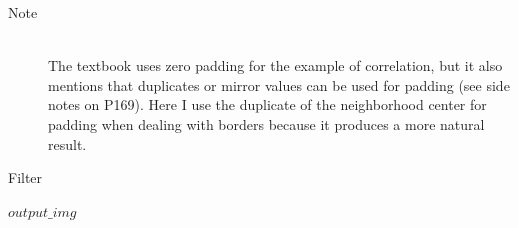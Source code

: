 \documentclass{article}
\begin{document}
\begin{description}
\item[Note] \hfill \\
The textbook uses zero padding for the example of correlation, but it also mentions that duplicates or mirror values can be used for padding (see side notes on P169). Here I use the duplicate of the neighborhood center for padding when dealing with borders because it produces a more natural result.

\end{description}

\begin{algorithm}[H]
\centering
\caption{Filter}
  \begin{algorithmic}[1]
     \State \Return $output\_img$ 
    \EndFunction
  \end{algorithmic}
\end{algorithm}


\end{document}

